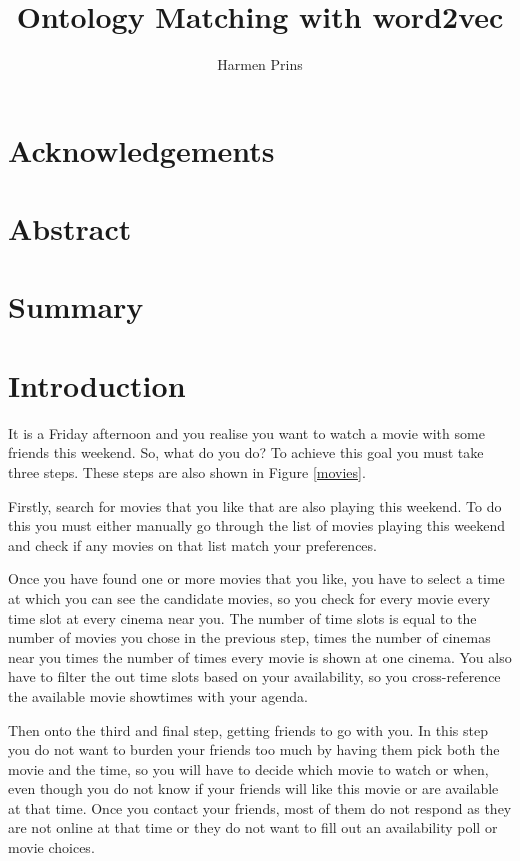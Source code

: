\documentclass{article}
\title{Ontology Matching with word2vec}
\author{Harmen Prins}
\begin{document}
 \maketitle
 \newpage
 
 \section*{Acknowledgements}
 \section*{Abstract}  
 
 \section*{Summary}
 \tableofcontents
 \newpage
 
 \section{Introduction} \label{intro}
 It is a Friday afternoon and you realise you want to watch a movie with some friends this weekend. So, what do you do? To achieve this goal you must take three steps. These steps are also shown in Figure \ref{movies}.
 
 Firstly, search for movies that you like that are also playing this weekend. To do this you must either manually go through the list of movies playing this weekend and check if any movies on that list match your preferences.
 
 Once you have found one or more movies that you like, you have to select a time at which you can see the candidate movies, so you check for every movie every time slot at every cinema near you. The number of time slots is equal to the number of movies you chose in the previous step, times the number of cinemas near you times the number of times every movie is shown at one cinema. You also have to filter the out time slots based on your availability, so you cross-reference the available movie showtimes with your agenda.
 
 Then onto the third and final step, getting friends to go with you. In this step you do not want to burden your friends too much by having them pick both the movie and the time, so you will have to decide which movie to watch or when, even though you do not know if your friends will like this movie or are available at that time. Once you contact your friends, most of them do not respond as they are not online at that time or they do not want to fill out an availability poll or movie choices.
 
\end{document}
